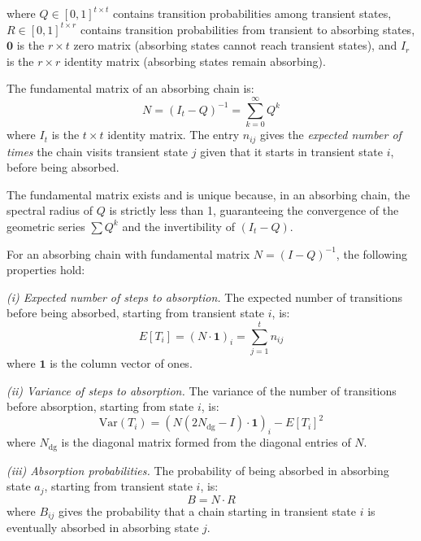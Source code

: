 where $Q \in [0,1]^{t \times t}$ contains transition probabilities among
transient states, $R \in [0,1]^{t \times r}$ contains transition
probabilities from transient to absorbing states, $\mathbf{0}$ is the
$r \times t$ zero matrix (absorbing states cannot reach transient states),
and $I_r$ is the $r \times r$ identity matrix (absorbing states remain
absorbing).

\begin{definition}
\label{def:fundamental-matrix}
The fundamental matrix of an absorbing chain is:
\begin{equation}
\label{eq:fundamental}
N = (I_t - Q)^{-1} = \sum_{k=0}^{\infty} Q^k
\end{equation}
where $I_t$ is the $t \times t$ identity matrix. The entry $n_{ij}$
gives the \emph{expected number of times} the chain visits transient
state $j$ given that it starts in transient state $i$, before being
absorbed.
\end{definition}

The fundamental matrix exists and is unique because, in an absorbing chain,
the spectral radius of $Q$ is strictly less than 1, guaranteeing the
convergence of the geometric series $\sum Q^k$ and the invertibility of
$(I_t - Q)$.

\begin{theorem}
\label{thm:absorption}
For an absorbing chain with fundamental matrix $N = (I - Q)^{-1}$,
the following properties hold:

\emph{(i) Expected number of steps to absorption.} The expected number of
transitions before being absorbed, starting from transient state $i$, is:
\begin{equation}
\label{eq:expected-steps}
E[T_i] = (N \cdot \mathbf{1})_i = \sum_{j=1}^{t} n_{ij}
\end{equation}
where $\mathbf{1}$ is the column vector of ones.

\emph{(ii) Variance of steps to absorption.} The variance of the number
of transitions before absorption, starting from state $i$, is:
\begin{equation}
\label{eq:variance-steps}
\text{Var}(T_i) = \left( N(2N_{\text{dg}} - I) \cdot \mathbf{1} \right)_i
- E[T_i]^2
\end{equation}
where $N_{\text{dg}}$ is the diagonal matrix formed from the diagonal
entries of $N$.

\emph{(iii) Absorption probabilities.} The probability of being absorbed
in absorbing state $a_j$, starting from transient state $i$, is:
\begin{equation}
\label{eq:absorption-prob}
B = N \cdot R
\end{equation}
where $B_{ij}$ gives the probability that a chain starting in transient
state $i$ is eventually absorbed in absorbing state $j$.
\end{theorem}

